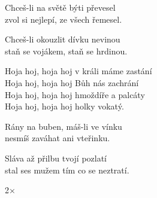 
\ve{}
Chceš-li na světě býti převesel\\
zvol si nejlepí, ze všech řemesel.

\ve{}
Chceš-li okouzlit dívku nevinou\\
staň se vojákem, staň se hrdinou.

\cho{}
Hoja hoj, hoja hoj v králi máme zastání\\
Hoja hoj, hoja hoj Bůh nás zachrání\\
Hoja hoj, hoja hoj hmoždíře a palcáty\\
Hoja hoj, hoja hoj holky vokatý.

\ve{} 
Rány na buben, máš-li ve vínku\\
nesmíš zaváhat ani vteřinku.

\ve{} 
Sláva až přilbu tvojí pozlatí\\
stal ses mužem tím co se neztratí.

\cho{}2×

\esong{}